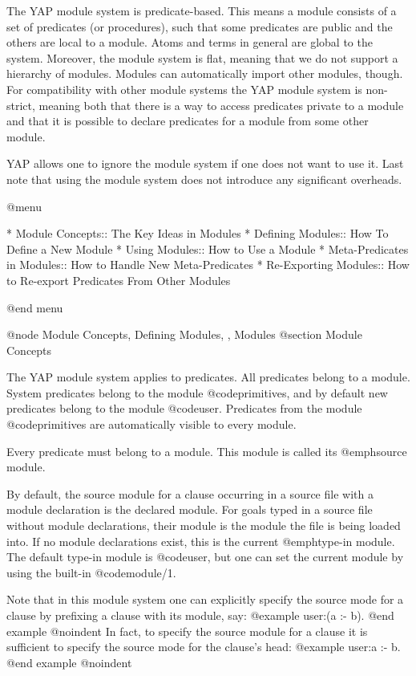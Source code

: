 {{{{The YAP module system is predicate-based. This means a module consists
of a set of predicates (or procedures), such that some predicates are
public and the others are local to a module. Atoms and terms in general
are global to the system. Moreover, the module system is flat, meaning
that we do not support a hierarchy of modules. Modules can
automatically import other modules, though. For compatibility with other
module systems the YAP module system is non-strict, meaning both that
there is a way to access predicates private to a module and that it
is possible to declare predicates for a module from some other module.

YAP allows one to ignore the module system if one does not want to use
it. Last note that using the module system does not introduce any
significant overheads.

@menu

* Module Concepts:: The Key Ideas in Modules
* Defining Modules:: How To Define a New Module
* Using Modules:: How to Use a Module
* Meta-Predicates in Modules:: How to Handle New Meta-Predicates
* Re-Exporting Modules:: How to Re-export Predicates From Other Modules

@end menu

@node Module Concepts, Defining Modules, , Modules
@section Module Concepts

The YAP module system applies to predicates. All predicates belong to a
module. System predicates belong to the module @code{primitives}, and by
default new predicates belong to the module @code{user}. Predicates from
the module @code{primitives} are automatically visible to every module.

Every predicate must belong to a module. This module is called its
@emph{source module}.

By default, the source module for a clause occurring in a source file
with a module declaration is the declared module. For goals typed in 
a source file without module declarations, their module is the module
the file is being loaded into. If no module declarations exist, this is
the current @emph{type-in module}. The default type-in module is
@code{user}, but one can set the current module by using the built-in
@code{module/1}.

Note that in this module system one can explicitly specify the source
mode for a clause by prefixing a clause with its module, say:
@example
user:(a :- b).
@end example
@noindent
In fact, to specify the source module for a clause it is sufficient to
specify the source mode for the clause's head:
@example
user:a :- b.
@end example
@noindent

}}}}

